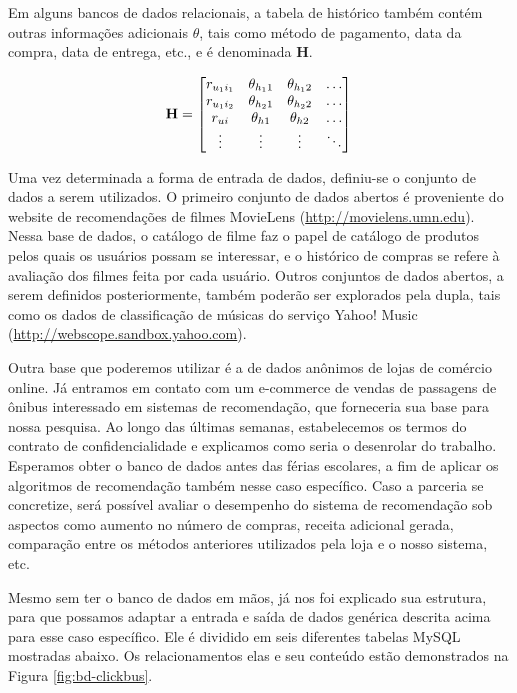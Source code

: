 Em alguns bancos de dados relacionais, a tabela de histórico também contém outras informações adicionais $\theta$, tais como método de pagamento, data da compra, data de entrega, etc., e é denominada $\mathbf{H}$.

\begin{equation} 
\mathbf{H} =
\begin{bmatrix} 
 r_{u_1 i_1} &  \theta_{h_1 1} &  \theta_{h_1 2} & \dots   \\
 r_{u_1 i_2} &  \theta_{h_2 1} &  \theta_{h_2 2} & \dots   \\
 r_{u i} &  \theta_{h 1} &  \theta_{h 2} & \dots   \\
 \vdots &  \vdots &  \vdots  & \ddots   \\
 \end{bmatrix} \\
\end{equation}

Uma vez determinada a forma de entrada de dados, definiu-se o conjunto de dados a serem utilizados. O primeiro conjunto de dados abertos é proveniente do website de recomendações de filmes MovieLens (\url{http://movielens.umn.edu}). Nessa base de dados, o catálogo de filme faz o papel de catálogo de produtos pelos quais os usuários possam se interessar, e o histórico de compras se refere à avaliação dos filmes feita por cada usuário. Outros conjuntos de dados abertos,  a serem definidos posteriormente, também poderão ser explorados pela dupla, tais como os dados de classificação de músicas do serviço Yahoo! Music (\url{http://webscope.sandbox.yahoo.com}).

Outra base que poderemos utilizar é a de dados anônimos de lojas de comércio online. Já entramos em contato com um e-commerce de vendas de passagens de ônibus interessado em sistemas de recomendação, que forneceria sua base  para nossa pesquisa. Ao longo das últimas semanas, estabelecemos os termos do contrato de confidencialidade e explicamos como seria o desenrolar do trabalho. Esperamos obter o banco de dados antes das férias escolares, a fim de aplicar os algoritmos de recomendação também nesse caso específico. Caso a parceria se concretize, será possível avaliar o desempenho do sistema de recomendação sob aspectos como aumento no número de compras, receita adicional gerada, comparação entre os métodos anteriores utilizados pela loja e o nosso sistema, etc.

Mesmo sem ter o banco de dados em mãos, já nos foi explicado sua estrutura, para que possamos adaptar a entrada e saída de dados genérica descrita acima para esse caso específico. Ele é dividido em seis diferentes tabelas MySQL mostradas abaixo. Os relacionamentos elas e seu conteúdo estão demonstrados na Figura \ref{fig:bd-clickbus}.


